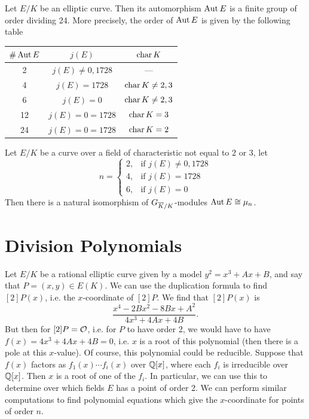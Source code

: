 \begin{thm}
Let $E/K$ be an elliptic curve. Then its automorphism $\operatorname{Aut} E$ is a finite group of order dividing 24. More precisely, the order of $\operatorname{Aut} E$ is given by the following table
	\begin{table}[!ht]
	\centering
	\begin{tabular}{|c|c|c|} \hline
	$\# \operatorname{Aut} E$ & $j(E)$ & $\operatorname{char} K$ \\ \hline \hline
	2 & $j(E) \neq 0, 1728$ & --- \\ \hline
	4 & $j(E)= 1728$ & $\operatorname{char} K \neq 2,3$ \\ \hline
	6 & $j(E)= 0$ & $\operatorname{char} K \neq 2,3$ \\ \hline 
	12 & $j(E)= 0 = 1728$ & $\operatorname{char} K= 3$ \\ \hline
	24 & $j(E)= 0 = 1728$ & $\operatorname{char} K= 2$ \\ \hline 
	\end{tabular}
	\end{table}
\end{thm}


\begin{cor}
Let $E/K$ be a curve over a field of characteristic not equal to 2 or 3, let
	\[
	n= 
	\begin{cases}
	2, & \text{if } j(E) \neq 0, 1728 \\
	4, & \text{if } j(E)= 1728 \\
	6, & \text{if } j(E)= 0
	\end{cases}
	\]
Then there is a natural isomorphism of $G_{\overline{K}/K}$-modules $\operatorname{Aut} E \cong \mu_n$.
\end{cor}





\section{Division Polynomials\label{sec:divpoly}}

Let $E/K$ be a rational elliptic curve given by a model $y^2= x^3 + Ax + B$, and say that $P= (x,y) \in E(K)$. We can use the duplication formula to find $[2]P(x)$, i.e. the $x$-coordinate of $[2]P$. We find that $[2]P(x)$ is
	\[
	\dfrac{x^4 - 2Bx^2 - 8Bx + A^2}{4x^3 + 4Ax + 4B}.
	\]
But then for $[2]P= \mathcal{O}$, i.e. for $P$ to have order 2, we would have to have $f(x)= 4x^3 + 4Ax + 4B= 0$, i.e. $x$ is a root of this polynomial (then there is a pole at this $x$-value). Of course, this polynomial could be reducible. Suppose that $f(x)$ factors as $f_1(x) \cdots f_i(x)$ over $\mathbb{Q}[x]$, where each $f_i$ is irreducible over $\mathbb{Q}[x]$. Then $x$ is a root of one of the $f_i$. In particular, we can use this to determine over which fields $E$ has a point of order 2. We can perform similar computations to find polynomial equations which give the $x$-coordinate for points of order $n$. 


